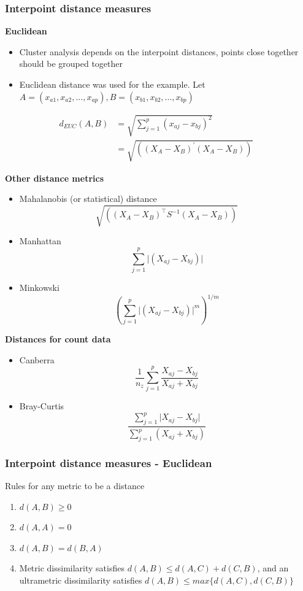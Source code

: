 \documentclass[a4paper]{article}\usepackage[]{graphicx}\usepackage[]{xcolor}
\begin{document}
\subsubsection{Interpoint distance measures}
\textbf{Euclidean}
\begin{itemize}
	\item Cluster analysis depends on the interpoint distances, points close together should be grouped together
	\item Euclidean distance was used for the example. Let \( A = (x_{a1}, x_{a2}, ..., x_{ap}), B=(x_{b1}, x_{b2}, ..., x_{bp}) \)
\end{itemize} 
\begin{align*}
d_{EUC}(A, B) &= \sqrt{\sum_{j=1}^p (x_{aj}-x_{bj})^2} &\\
&= \sqrt{((X_A-X_B)^\prime (X_A-X_B))}&
\end{align*}

\textbf{Other distance metrics}
\begin{itemize}
	\item Mahalanobis (or statistical) distance
	\[
		\sqrt{((X_A-X_B)^\top S^{-1} (X_A-X_B))}
	\]
	\item Manhattan
	\[
		\sum_{j=1}^p \lvert (X_{aj}-X_{bj}) \rvert
	\]
	\item Minkowski
	\[
		(\sum_{j=1}^p \lvert (X_{aj}-X_{bj}) \rvert^m)^{1/m}
	\]
\end{itemize}
\textbf{Distances for count data}
\begin{itemize}
	\item Canberra
	\[
		\frac{1}{n_z}\sum_{j=1}^p\frac{X_{aj}-X_{bj}}{X_{aj}+X_{bj}}
	\]
	\item Bray-Curtis
	\[
		\frac{\sum_{j=1}^p \lvert X_{aj}-X_{bj} \rvert}{\sum_{j=1}^p(X_{aj}+X_{bj})}
	\]
\end{itemize}
\subsubsection{Interpoint distance measures - Euclidean}
Rules for any metric to be a distance
\begin{enumerate}
	\item \( d(A, B) \geq 0 \)
	\item \( d(A, A) = 0 \)
	\item \( d(A, B) = d(B, A) \)
	\item Metric dissimilarity satisfies \( d(A, B) \leq d(A, C) + d(C, B) \), and an ultrametric dissimilarity satisfies \( d(A, B) \leq max\{d(A, C), d(C, B)\} \)
\end{enumerate}
\end{document}

